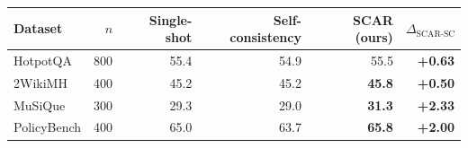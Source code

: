 \begin{tabular}{lrrrrr}
\toprule
Dataset & $n$ & Single-shot & Self-consistency & \textbf{SCAR (ours)} & $\Delta_\text{SCAR-SC}$ \\
\midrule
HotpotQA & 800 & 55.4 & 54.9 & 55.5 & \textbf{+0.63} \\
2WikiMH & 400 & 45.2 & 45.2 & \textbf{45.8} & \textbf{+0.50} \\
MuSiQue & 300 & 29.3 & 29.0 & \textbf{31.3} & \textbf{+2.33} \\
PolicyBench & 400 & 65.0 & 63.7 & \textbf{65.8} & \textbf{+2.00} \\
\bottomrule
\end{tabular}